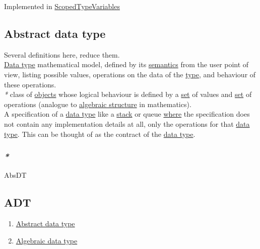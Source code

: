\documentclass[11pt]{article}
\begin{document}
Implemented in \hyperref[org98e1643]{ScopedTypeVariables}\\

\subsection{\label{orgafd641a}Abstract data type}
\label{sec:orgc75b88c}

Several definitions here, reduce them.\\

\hyperref[org212d9c3]{Data type} mathematical model, defined by its \hyperref[orgbbcc036]{semantics} from the user point of view, listing possible values, operations on the data of the \hyperref[orgc4aea2f]{type}, and behaviour of these operations.\\

\emph{*} class of \hyperref[org363acc2]{objects} whose logical behaviour is defined by a \hyperref[org1faf06d]{set} of values and \hyperref[org1faf06d]{set} of operations (analogue to \hyperref[org2ee73e8]{algebraic structure} in mathematics).\\

A specification of a \hyperref[org212d9c3]{data type} like a \hyperref[org02af145]{stack} or queue \hyperref[org3e5903d]{where} the specification does not contain any implementation details at all, only the operations for that \hyperref[org212d9c3]{data type}. This can be thought of as the contract of the \hyperref[org212d9c3]{data type}.\\

\subsubsection{\emph{*}}
\label{sec:org7d25ee5}

\label{org3474b5b}AbsDT\\

\subsection{\label{org6dafb3a}ADT}
\label{sec:org75a6d8c}
\begin{enumerate}
\item \hyperref[orgafd641a]{Abstract data type}\\
\item \hyperref[org2278a14]{Algebraic data type}\\
\end{enumerate}
\end{document}
